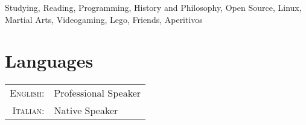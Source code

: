 \documentclass[10pt]{article} %
\begin{document}
\begin{paracol}{2}
\large Studying, Reading, Programming, History and Philosophy, Open Source, Linux, Martial Arts,
Videogaming, Lego, Friends, Aperitivos

\medskip %


\section{Languages}

\begin{tabular}{rl}
	\textsc{English:} & Professional Speaker\\

	\textsc{Italian:} & Native Speaker\\

\end{tabular}

\medskip %


\end{paracol}

\end{document}
